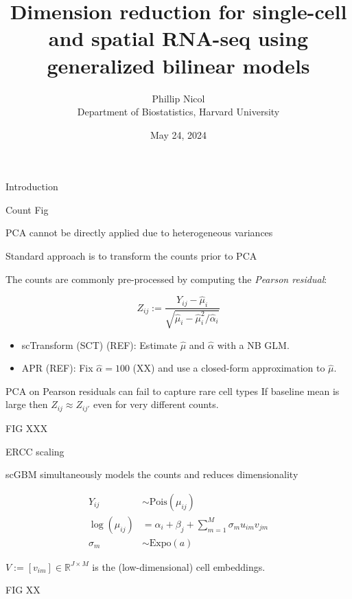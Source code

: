 \documentclass[aspectratio=43]{beamer}
\title{Dimension reduction for single-cell and spatial RNA-seq using generalized bilinear models}
\author{\texorpdfstring{Phillip Nicol \\ Department of Biostatistics, Harvard University}{}}
\institute{NESS 2024 (Storrs, CT)}
\date{May 24, 2024}
\newcommand{\R}{\mathbb{R}}
\begin{document}
\titlepage

\begin{frame}{Introduction}

Count Fig 
\end{frame}

\begin{frame}{PCA cannot be directly applied due to heterogeneous variances}

\end{frame}

\begin{frame}{Standard approach is to transform the counts prior to PCA}

The counts are commonly pre-processed by computing the \textit{Pearson residual}:

\begin{equation}
Z_{ij} := \frac{Y_{ij} - \hat{\mu}_{i}}{\sqrt{ \hat{\mu}_{i} - \hat{\mu}_{i}^2 / \hat{\alpha}_i}}
\end{equation}

\begin{itemize}
\item scTransform (SCT) (REF): Estimate $\hat{\mu}$ and $\hat{\alpha}$ with a NB GLM.
\item APR (REF): Fix $\hat{\alpha} = 100$ (XX) and use a closed-form approximation to $\hat{\mu}$. 
\end{itemize}
\end{frame}

\begin{frame}{PCA on Pearson residuals can fail to capture rare cell types}
If baseline mean is large then $Z_{ij} \approx Z_{ij'}$ even for very different counts.

FIG XXX 
\end{frame}

\begin{frame}{ERCC scaling}

\end{frame}

\begin{frame}{scGBM simultaneously models the counts and reduces dimensionality}

\begin{equation}
\begin{split}
Y_{ij} &\sim \text{Pois}(\mu_{ij}) \\
\log(\mu_{ij}) &= \alpha_i + \beta_j + \sum_{m=1}^M \sigma_m u_{im} v_{jm} \\
\sigma_m &\sim \text{Expo}(a)
\end{split}
\end{equation}

$V := [v_{im}] \in \R^{J \times M}$ is the (low-dimensional) cell embeddings.


FIG XX 
\end{frame}
\end{document}
